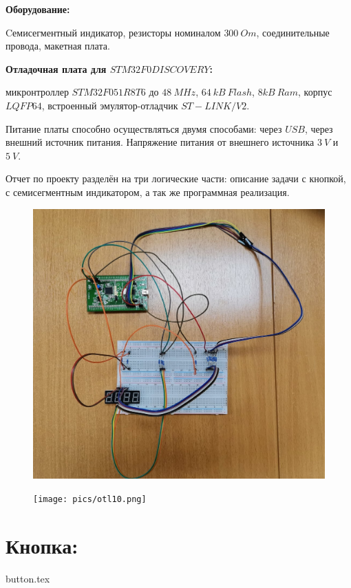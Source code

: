\documentclass[15pt,a5paper,reqno]{article}
\begin{document}
\textbf{Оборудование:}

Cемисегментный индикатор, резисторы номиналом $300 \: Om$, соединительные провода, макетная плата.

\textbf{Отладочная плата для $STM32F0DISCOVERY$:}

микронтроллер $STM32F051R8T6$ до $48 \: MHz$, $64 \: kB \: Flash$, $8 kB \: Ram$, корпус $LQFP64$, встроенный эмулятор-отладчик $ST-LINK/V2$.

Питание платы способно осуществляться двумя способами: через $USB$, через внешний источник питания. Напряжение питания от внешнего источника $3 \: V$ и $5 \: V$.

Отчет по проекту разделён на три логические части: описание задачи с кнопкой, с семисегментным индикатором, а так же программная реализация.


\begin{figure}[h!]
		\centering
		\includegraphics[width=0.8\linewidth]{pics/photo_of_stm.png}
		\caption{}
		\label{stm}
\end{figure}

\begin{figure}[h!]
		\centering
		\texttt{[image: pics/otl10.png]}
		\caption{}
		\label{otl10}
\end{figure}

\newpage


\section{Кнопка:}


{button.tex}
\end{document}

